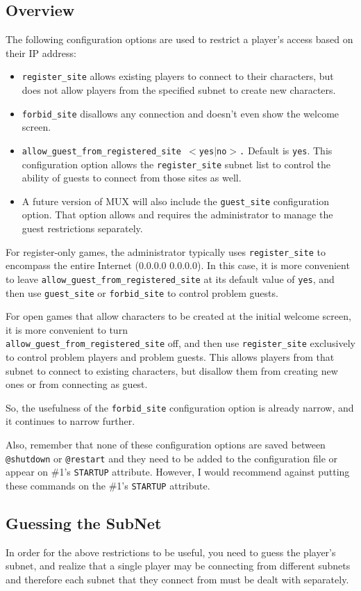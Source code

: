 \documentclass[10pt,letterpaper]{book}
\begin{document}
\subsection{Overview}
The following configuration options are used to restrict a player's access
based on their IP address:
\begin{itemize}
\item
\texttt{register\_site} allows existing players to connect to their
characters, but does not allow players from the specified subnet to create
new characters.
\item
\texttt{forbid\_site} disallows any connection and doesn't even show the
welcome screen.
\item
\texttt{allow\_guest\_from\_registered\_site $<$yes$|$no$>$.}  Default is
\texttt{yes}. This configuration option allows the \texttt{register\_site}
subnet list to control the ability of guests to connect from those sites as
well.
\item A future version of MUX will also include the \texttt{guest\_site}
configuration option. That option allows and requires the administrator to
manage the guest restrictions separately.
\end{itemize}
For register-only games, the administrator typically uses
\texttt{register\_site} to encompass the entire Internet (0.0.0.0 0.0.0.0).
In this case, it is more convenient to leave
\texttt{allow\_guest\_from\_registered\_site} at its default value of
\texttt{yes}, and then use \texttt{guest\_site} or \texttt{forbid\_site} to
control problem guests.

For open games that allow characters to be created at the initial welcome
screen, it is more convenient to turn\\
\texttt{allow\_guest\_from\_registered\_site} off, and then use
\texttt{register\_site} exclusively to control problem players and problem
guests. This allows players from that subnet to connect to existing
characters, but disallow them from creating new ones or from connecting as
guest.

So, the usefulness of the \texttt{forbid\_site} configuration option is
already narrow, and it continues to narrow further.

Also, remember that none of these configuration options are saved between
\texttt{@shutdown} or \texttt{@restart} and they need to be added to the
configuration file or appear on \#1's \texttt{STARTUP} attribute. However,
I would recommend against putting these commands on the \#1's \texttt{STARTUP}
attribute.
\subsection{Guessing the SubNet}
In order for the above restrictions to be useful, you need to guess the
player's subnet, and realize that a single player may be connecting from
different subnets and therefore each subnet that they connect from must be
dealt with separately.
\end{document}
